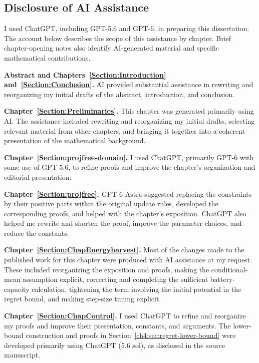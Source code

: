 \subsection*{Disclosure of AI Assistance}
\label{sec:ai-assistance}

I used ChatGPT, including GPT-5.6 and GPT-6, in preparing this dissertation.
The account below describes the scope of this assistance by chapter.
Brief chapter-opening notes also identify AI-generated material and
specific mathematical contributions.

\noindent\textbf{Abstract and Chapters~\ref{Section:Introduction}
and~\ref{Section:Conclusion}.}
AI provided substantial assistance in rewriting and reorganizing my initial
drafts of the abstract, introduction, and conclusion.

\noindent\textbf{Chapter~\ref{Section:Preliminaries}.}
This chapter was generated primarily using AI. The assistance included
rewriting and reorganizing my initial drafts, selecting relevant material
from other chapters, and bringing it together into a coherent presentation
of the mathematical background.

\noindent\textbf{Chapter~\ref{Section:projfree-domain}.}
I used ChatGPT, primarily GPT-6 with some use of GPT-5.6, to refine proofs
and improve the chapter's organization and editorial presentation.

\noindent\textbf{Chapter~\ref{Section:projfree}.}
GPT-6 Astra suggested replacing the constraints by their positive parts
within the original update rules, developed the corresponding proofs, and
helped with the chapter's exposition. ChatGPT also helped me rewrite and
shorten the proof, improve the parameter choices, and reduce the constants.

\par{}
\noindent\textbf{Chapter~\ref{Section:ChapEnergyharvest}.}
Most of the changes made to the published work for this chapter were
produced with AI assistance at my request. These included reorganizing
the exposition and proofs, making the conditional-mean assumption
explicit, correcting and completing the sufficient battery-capacity
calculation, tightening the term involving the initial potential in the
regret bound, and making step-size tuning explicit.

\noindent\textbf{Chapter~\ref{Section:ChapControl}.}
I used ChatGPT to refine and reorganize my proofs and improve their
presentation, constants, and arguments. The lower-bound construction and
proofs in Section~\ref{ch4:sec:regret-lower-bound} were developed primarily
using ChatGPT (5.6 sol), as disclosed in the source manuscript.

